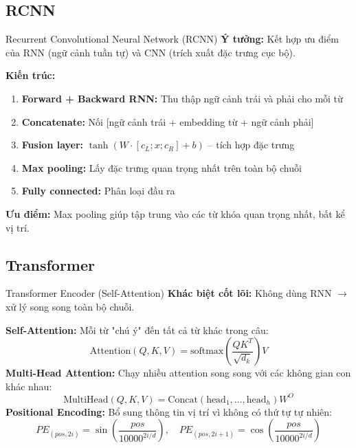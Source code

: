 \documentclass[serif, aspectratio=169]{beamer}
\begin{document}
\subsection{RCNN}
\begin{frame}{Recurrent Convolutional Neural Network (RCNN)}
\footnotesize
\textbf{Ý tưởng:} Kết hợp ưu điểm của RNN (ngữ cảnh tuần tự) và CNN (trích xuất đặc trưng cục bộ).

\vspace{0.3cm}
\textbf{Kiến trúc:}
\begin{enumerate}
    \item \textbf{Forward + Backward RNN:} Thu thập ngữ cảnh trái và phải cho mỗi từ
    \item \textbf{Concatenate:} Nối [ngữ cảnh trái + embedding từ + ngữ cảnh phải]
    \item \textbf{Fusion layer:} $\tanh(W \cdot [c_L; x; c_R] + b)$ -- tích hợp đặc trưng
    \item \textbf{Max pooling:} Lấy đặc trưng quan trọng nhất trên toàn bộ chuỗi
    \item \textbf{Fully connected:} Phân loại đầu ra
\end{enumerate}
\vspace{0.2cm}
\textbf{Ưu điểm:} Max pooling giúp tập trung vào các từ khóa quan trọng nhất, bất kể vị trí.
\end{frame}

\subsection{Transformer}
\begin{frame}{Transformer Encoder (Self-Attention)}
\textbf{Khác biệt cốt lõi:} Không dùng RNN $\rightarrow$ xử lý song song toàn bộ chuỗi.

\vspace{0.3cm}
\textbf{Self-Attention:} Mỗi từ "chú ý" đến tất cả từ khác trong câu:
\[
\text{Attention}(Q, K, V) = \text{softmax}\left(\frac{QK^T}{\sqrt{d_k}}\right)V
\]
\vspace{0.2cm}
\textbf{Multi-Head Attention:} Chạy nhiều attention song song với các không gian con khác nhau:
\[
\text{MultiHead}(Q, K, V) = \text{Concat}(\text{head}_1, \ldots, \text{head}_h)W^O
\]
\vspace{0.2cm}
\textbf{Positional Encoding:} Bổ sung thông tin vị trí vì không có thứ tự tự nhiên:
\[
PE_{(pos, 2i)} = \sin\left(\frac{pos}{10000^{2i/d}}\right), \quad
PE_{(pos, 2i+1)} = \cos\left(\frac{pos}{10000^{2i/d}}\right)
\]
\end{frame}
\end{document}
